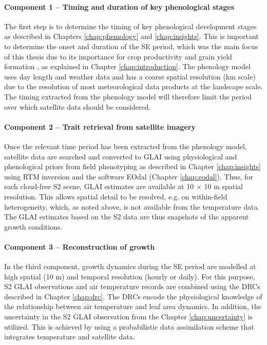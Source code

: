\paragraph{Component 1 -- Timing and duration of key phenological stages}
The first step is to determine the timing of key phenological development stages as described in Chapters \ref{chap:phemology} and \ref{chap:insights}. This is important to determine the onset and duration of the \gls{SE} period, which was the main focus of this thesis due to its importance for crop productivity and grain yield formation \citep{gonzalez_grain_2003, fischer_wheat_2011}, as explained in Chapter \ref{chap:introduction}. The phenology model uses day length and weather data and has a coarse spatial resolution (km scale) due to the resolution of most meteorological data products at the landscape scale. The timing extracted from the phenology model will therefore limit the period over which satellite data should be considered.

\paragraph{Component 2 -- Trait retrieval from satellite imagery}
Once the relevant time period has been extracted from the phenology model, satellite data are searched and converted to \gls{GLAI} using physiological and phenological priors from field phenotyping as described in Chapter \ref{chap:insights} using RTM inversion and the software \gls{EOdal} (Chapter \ref{chap:eodal}). Thus, for each cloud-free \gls{S2} scene, \gls{GLAI} estimates are available at 10 $\times$ 10 m spatial resolution. This allows spatial detail to be resolved, e.g. on within-field heterogeneity, which, as noted above, is not available from the temperature data. The \gls{GLAI} estimates based on the \gls{S2} data are thus snapshots of the apparent growth conditions.

\paragraph{Component 3 -- Reconstruction of growth}
In the third component, growth dynamics during the \gls{SE} period are modelled at high spatial (10 m) and temporal resolution (hourly or daily). For this purpose, \gls{S2} \gls{GLAI} observations and air temperature records are combined using the \gls{DRC}s described in Chapter \ref{chap:drc}. The \gls{DRC}s encode the physiological knowledge of the relationship between air temperature and leaf area dynamics. In addition, the uncertainty in the \gls{S2} \gls{GLAI} observation from the Chapter \ref{chap:uncertainty} is utilized. This is achieved by using a probabilistic data assimilation scheme that integrates temperature and satellite data.

